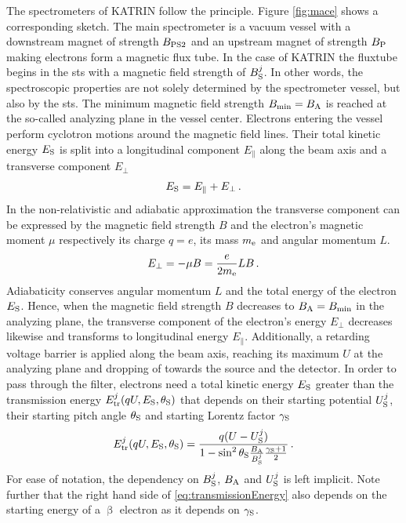 The spectrometers of KATRIN follow the  principle. Figure \ref{fig:mace} shows a corresponding sketch. The main spectrometer is a vacuum vessel with a downstream magnet of strength $B_\mathrm{PS2}$ and an upstream magnet of strength $B_\mathrm{P}$ making electrons form a magnetic flux tube. In the case of KATRIN the fluxtube begins in the \gls{sts} with a magnetic field strength of $B^j_\mathrm{S}$. In other words, the spectroscopic properties are not solely determined by the spectrometer vessel, but also by the \gls{sts}. The minimum magnetic field strength $B_\mathrm{min} = B_\mathrm{A}$ is reached at the so-called analyzing plane in the vessel center. Electrons entering the vessel perform cyclotron motions around the magnetic field lines. Their total kinetic energy $E_\mathrm{S}$ is split into a longitudinal component $E_\parallel$ along the beam axis and a transverse component $E_\bot$
\begin{equation}
    \label{eq:totalKinElecEnergy}
    E_\mathrm{S} = E_\parallel + E_\bot \text{\,.}
\end{equation}
In the non-relativistic and adiabatic approximation the transverse component can be expressed by the magnetic field strength $B$ and the electron's magnetic moment $\mu$ respectively its charge $q=e$, its mass $m_{\mathrm{e}}$ and angular momentum $L$.
\begin{equation}
    E_\bot = - \mu B = \frac{e}{2 m_{\mathrm{e}}}LB \text{\,.}
\end{equation}
Adiabaticity conserves angular momentum $L$ and the total energy of the electron $E_\mathrm{S}$. Hence, when the magnetic field strength $B$ decreases to $B_\mathrm{A}=B_\mathrm{min}$ in the analyzing plane, the transverse component of the electron's energy $E_\bot$ decreases likewise and transforms to longitudinal energy $E_\parallel$. Additionally, a retarding voltage barrier is applied along the beam axis, reaching its maximum $U$ at the analyzing plane and dropping of towards the source and the detector. 
In order to pass through the filter, electrons need a total kinetic energy $E_\mathrm{S}$ greater than the transmission energy $E^j_\mathrm{tr}(qU,E_\mathrm{S},\theta_\mathrm{S})$ that depends on their starting potential $U^j_\mathrm{S}$, their starting pitch angle $\theta_\mathrm{S}$ and starting Lorentz factor $\gamma_\mathrm{S}$
\begin{equation}
    \label{eq:transmissionEnergy}
    E^j_\mathrm{tr}(qU,E_\mathrm{S},\theta_\mathrm{S}) = 
    \frac{
        q(U-U^j_\mathrm{S})
    }{
        1-\sin^2\theta_\mathrm{S} \frac{B_\mathrm{A}}{B^j_\mathrm{S}} \frac{\gamma_\mathrm{S}+1}{2}
    }
    \text{\,.}
\end{equation}
For ease of notation, the dependency on $B^j_\mathrm{S}$, $B_\mathrm{A}$ and $U^j_\mathrm{S}$ is left implicit. Note further that the right hand side of \eqref{eq:transmissionEnergy} also depends on the starting energy of a $\upbeta$ electron as it depends on $\gamma_\mathrm{S}$.

